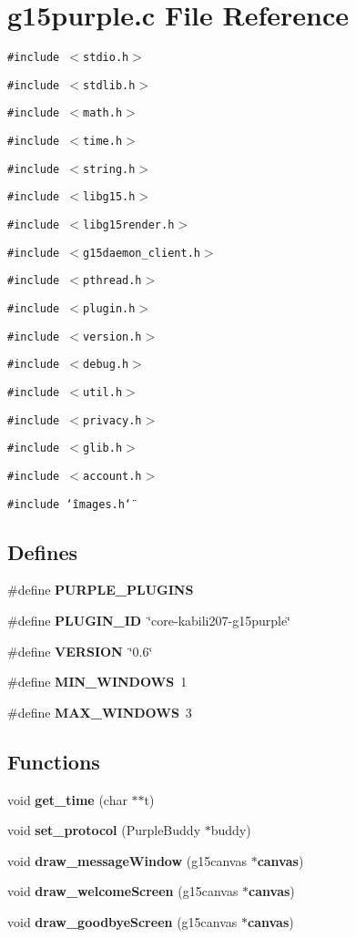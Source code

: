 \section{g15purple.c File Reference}
\label{g15purple_8c}
{\tt \#include $<$stdio.h$>$}\par
{\tt \#include $<$stdlib.h$>$}\par
{\tt \#include $<$math.h$>$}\par
{\tt \#include $<$time.h$>$}\par
{\tt \#include $<$string.h$>$}\par
{\tt \#include $<$libg15.h$>$}\par
{\tt \#include $<$libg15render.h$>$}\par
{\tt \#include $<$g15daemon\_\-client.h$>$}\par
{\tt \#include $<$pthread.h$>$}\par
{\tt \#include $<$plugin.h$>$}\par
{\tt \#include $<$version.h$>$}\par
{\tt \#include $<$debug.h$>$}\par
{\tt \#include $<$util.h$>$}\par
{\tt \#include $<$privacy.h$>$}\par
{\tt \#include $<$glib.h$>$}\par
{\tt \#include $<$account.h$>$}\par
{\tt \#include \char`\"{}images.h\char`\"{}}\par
\subsection*{Defines}
\begin{CompactItemize}
\item 
\#define {\bf PURPLE\_\-PLUGINS}
\item 
\#define {\bf PLUGIN\_\-ID}~\char`\"{}core-kabili207-g15purple\char`\"{}
\item 
\#define {\bf VERSION}~\char`\"{}0.6\char`\"{}
\item 
\#define {\bf MIN\_\-WINDOWS}~1
\item 
\#define {\bf MAX\_\-WINDOWS}~3
\end{CompactItemize}
\subsection*{Functions}
\begin{CompactItemize}
\item 
void {\bf get\_\-time} (char $\ast$$\ast$t)
\item 
void {\bf set\_\-protocol} (PurpleBuddy $\ast$buddy)
\item 
void {\bf draw\_\-messageWindow} (g15canvas $\ast${\bf canvas})
\item 
void {\bf draw\_\-welcomeScreen} (g15canvas $\ast${\bf canvas})
\item 
void {\bf draw\_\-goodbyeScreen} (g15canvas $\ast${\bf canvas})
\end{CompactItemize}
